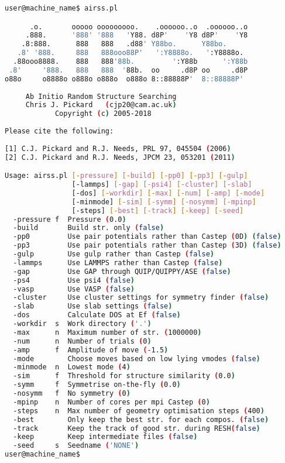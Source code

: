 \documentclass[a4paper, 10pt]{article}
\begin{document}
\newpage
\begin{lstlisting}[language={bash}]
user@machine_name$ airss.pl

      .o.       ooooo ooooooooo.    .oooooo..o  .oooooo..o 
     .888.      '888' '888   'Y88. d8P'    'Y8 d8P'    'Y8 
    .8:888.      888   888   .d88' Y88bo.      Y88bo.      
   .8' '888.     888   888ooo88P'   ':Y8888o.   ':Y8888o.  
  .88ooo8888.    888   888'88b.         ':Y88b      ':Y88b 
 .8'     '888.   888   888  '88b.  oo     .d8P oo     .d8P 
o88o     o8888o o888o o888o  o888o 8::88888P'  8::88888P'  
                                                      
     Ab Initio Random Structure Searching             
     Chris J. Pickard   (cjp20@cam.ac.uk)            
            Copyright (c) 2005-2018                   
                                                      
Please cite the following:                                 
                                                      
[1] C.J. Pickard and R.J. Needs, PRL 97, 045504 (2006)     
[2] C.J. Pickard and R.J. Needs, JPCM 23, 053201 (2011)    

Usage: airss.pl [-pressure] [-build] [-pp0] [-pp3] [-gulp] 
                [-lammps] [-gap] [-psi4] [-cluster] [-slab] 
                [-dos] [-workdir] [-max] [-num] [-amp] [-mode] 
                [-minmode] [-sim] [-symm] [-nosymm] [-mpinp] 
                [-steps] [-best] [-track] [-keep] [-seed]
  -pressure f  Pressure (0.0)
  -build       Build str. only (false)
  -pp0         Use pair potentials rather than Castep (0D) (false)
  -pp3         Use pair potentials rather than Castep (3D) (false)
  -gulp        Use gulp rather than Castep (false)
  -lammps      Use LAMMPS rather than Castep (false)
  -gap         Use GAP through QUIP/QUIPPY/ASE (false)
  -ps4         Use psi4 (false)
  -vasp        Use VASP (false)
  -cluster     Use cluster settings for symmetry finder (false)
  -slab        Use slab settings (false)
  -dos         Calculate DOS at Ef (false)
  -workdir  s  Work directory ('.')
  -max      n  Maximum number of str. (1000000)
  -num      n  Number of trials (0)
  -amp      f  Amplitude of move (-1.5)
  -mode        Choose moves based on low lying vmodes (false)
  -minmode  n  Lowest mode (4)
  -sim      f  Threshold for structure similarity (0.0)
  -symm     f  Symmetrise on-the-fly (0.0)
  -nosymm   f  No symmetry (0)
  -mpinp    n  Number of cores per mpi Castep (0)
  -steps    n  Max number of geometry optimisation steps (400)
  -best        Only keep the best str. for each compos. (false)
  -track       Keep the track of good str. during RESH(false)
  -keep        Keep intermediate files (false)
  -seed     s  Seedname ('NONE')
user@machine_name$
\end{lstlisting}
\end{document}
